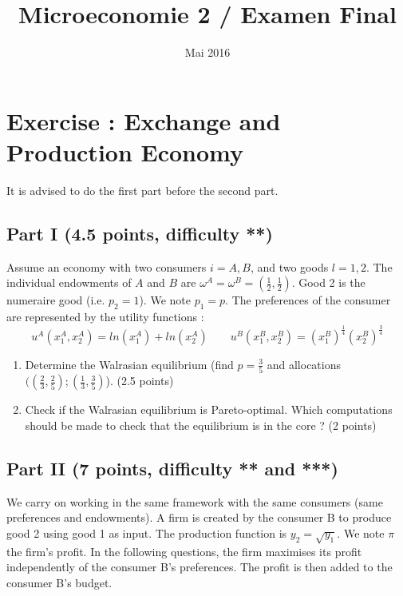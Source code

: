 \documentclass[11pt]{article} %
\title{Microeconomie 2 / Examen Final}
\date{Mai 2016} %
\begin{document}
\maketitle


\section*{Exercise : Exchange and Production Economy }
It is advised to do the first part before the second part.\\

\subsection*{Part I {\small (4.5 points, difficulty **)}}
Assume an economy with two consumers $i = A, B$, and two goods $l = 1, 2$. The individual endowments of $A$ and $B$ are $\omega^A = \omega^B = (\frac{1}{2}, \frac{1}{2})$. Good 2 is the numeraire good (i.e. $p_2 = 1$). We note $p_1 = p$. The preferences of the consumer are represented by the utility functions :
\begin{equation*}
u^A(x_1^A, x_2^A) = ln(x_1^A) + ln(x_2^A) \quad  \quad
u^B(x_1^B, x_2^B) = (x_1^B)^{\frac{1}{4}}(x_2^B)^{\frac{3}{4}} 
\end{equation*}


\begin{enumerate}
\item Determine the Walrasian equilibrium (find $p = \frac{3}{5}$ and allocations $((\frac{2}{3},\frac{2}{5}) ; (\frac{1}{3},\frac{3}{5})$). (2.5 points)
\item Check if the Walrasian equilibrium is Pareto-optimal. Which computations should be made to check that the equilibrium is in the core ? (2 points)

\end{enumerate}

\subsection*{Part II {\small (7 points, difficulty ** and ***)}}
We carry on working in the same framework with the same consumers (same preferences and endowments). A firm is created by the consumer B to produce good 2 using good 1 as input. The production function is $y_2 = \sqrt{y_1}$. We note $\pi$ the firm's profit. In the following questions, the firm maximises its profit independently of the consumer B's preferences. The profit is then added to the consumer B's budget.
\end{document}
